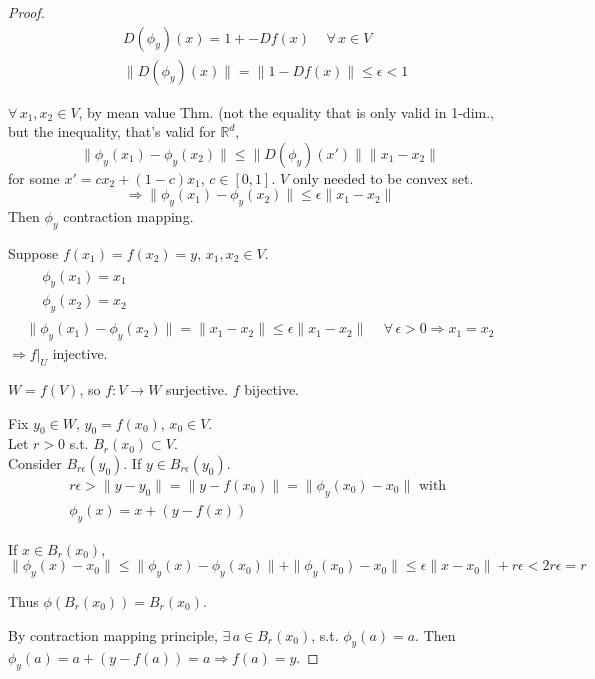 \documentclass[10pt]{amsart}
\begin{document}
\begin{multicols*}{2}
\begin{proof}
\[
\begin{aligned}
  & D(\phi_y)(x) = 1 + - Df(x) \quad \, \forall \, x \in V \\ 
  & \| D(\phi_y)(x) \| = \| 1 - Df(x) \| \leq \epsilon <1
\end{aligned}
\]

$\forall \, x_1 ,x_2 \in V$, by mean value Thm. (not the equality that is only valid in 1-dim., but the inequality, that's valid for $\mathbb{R}^d$, 
\[
\| \phi_y(x_1) - \phi_y(x_2) \| \leq \| D(\phi_y)(x') \| \| x_1 - x_2 \| 
\]
for some $x' = cx_2 + (1-c)x_1$, $c\in [0,1]$.  $V$ only needed to be convex set.  
\[
\Longrightarrow \| \phi_y(x_1) - \phi_y(x_2) \| \leq \epsilon \| x_1 - x_2 \|
\]
Then $\phi_y$ contraction mapping.  

Suppose $f(x_1) = f(x_2)=y$, $x_1,x_2 \in V$.  
\[
\begin{gathered}
\begin{aligned}
  & \phi_y(x_1) =x_1 \\ 
  & \phi_y(x_2) =x_2  
\end{aligned} \\
\| \phi_y(x_1) - \phi_y(x_2) \| = \| x_1 - x_2 \| \leq \epsilon \| x_1 - x_2 \| \quad \, \forall \, \epsilon > 0 \Longrightarrow x_1 = x_2 
\end{gathered}
\]
$\Longrightarrow \left. f\right|_U$ injective.

$W=f(V)$, so $f:V\to W$ surjective.  $f$ bijective.  

Fix $y_0 \in W$, $y_0 = f(x_0)$, $x_0 \in V$.  \\
Let $r>0$ s.t. $B_r(x_0) \subset V$.  \\
Consider $B_{r\epsilon}(y_0)$.  If $y\in B_{r\epsilon}(y_0)$.  
\[
\begin{gathered}
  r\epsilon > \| y-y_0 \| = \| y - f(x_0) \| = \| \phi_y(x_0) - x_0 \| \text{ with } \\
  \phi_y(x) = x + (y-f(x))
\end{gathered}
\]

If $x\in B_r(x_0)$, 
\[
\| \phi_y(x) -x_0 \| \leq \| \phi_y(x) - \phi_y(x_0) \|  + \| \phi_y(x_0) - x_0 \| \leq \epsilon \| x-x_0 \| + r\epsilon < 2 r\epsilon = r
\]


Thus $\phi(B_r(x_0)) = B_r(x_0)$.

By contraction mapping principle, $\exists \, a \in B_r(x_0)$, s.t. $\phi_y(a)=a$.  Then $\phi_y(a) = a+ (y-f(a)) = a \Longrightarrow f(a) =y$.  


\end{proof}
\end{multicols*}
\end{document}
